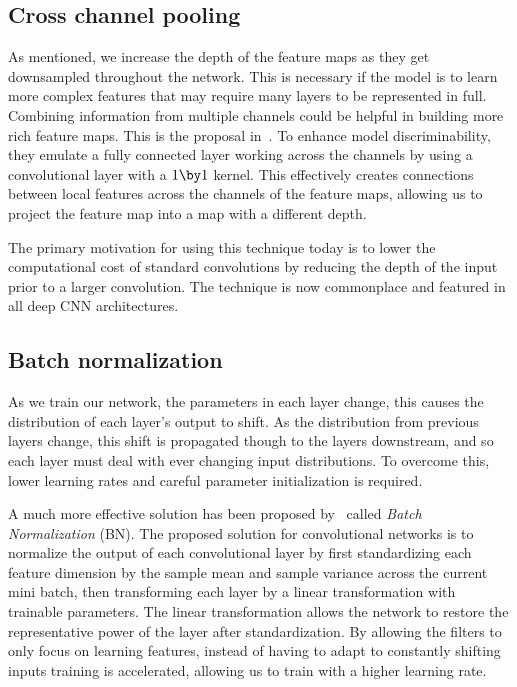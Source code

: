 \subsection{Cross channel pooling}

As mentioned, we increase the depth of the feature maps as they get downsampled throughout the network.
This is necessary if the model is to learn more complex features that may require many layers to be represented in full.
Combining information from multiple channels could be helpful in building more rich feature maps.
This is the proposal in~\cite{lin2014network}.
To enhance model discriminability, they emulate a fully connected layer working across the channels by using a convolutional layer with a \(1\by 1\) kernel.
This effectively creates connections between local features across the channels of the feature maps, allowing us to project the feature map into a map with a different depth.

The primary motivation for using this technique today is to lower the computational cost of standard convolutions by reducing the depth of the input prior to a larger convolution.
The technique is now commonplace and featured in all deep CNN architectures.

\subsection{Batch normalization}
As we train our network, the parameters in each layer change, this causes the distribution of each layer’s output to shift.
As the distribution from previous layers change, this shift is propagated though to the layers downstream, and so each layer must deal with ever changing input distributions.
To overcome this, lower learning rates and careful parameter initialization is required. 

A much more effective solution has been proposed by~\cite{ioffe2015batch} called \textit{Batch Normalization} (BN).
The proposed solution for convolutional networks is to normalize the output of each convolutional layer by first standardizing each feature dimension by the sample mean and sample variance across the current mini batch, then transforming each layer by a linear transformation with trainable parameters.
The linear transformation allows the network to restore the representative power of the layer after standardization.
By allowing the filters to only focus on learning features, instead of having to adapt to constantly shifting inputs training is accelerated, allowing us to train with a higher learning rate.

